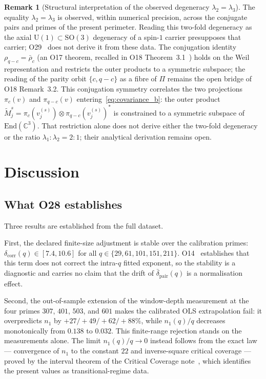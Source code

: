 \documentclass[11pt,a4paper]{article}
\theoremstyle{definition}
\newtheorem{remark}[theorem]{Remark}
\begin{document}
    \begin{remark}[Structural interpretation of the observed degeneracy $\lambda_2 = \lambda_3$]
      \label{rem:degeneracy}
      The equality $\lambda_2 = \lambda_3$ is observed, within numerical precision, across the
      conjugate pairs and primes of the present perimeter.
      Reading this two-fold degeneracy as the axial $\mathrm{U}(1) \subset \mathrm{SO}(3)$
      degeneracy of a spin-$1$ carrier presupposes that carrier; O29~\cite{Beau2026a33} does not
      derive it from these data.
      The conjugation identity $\rho_{q-c} = \bar\rho_c$ (an O17 theorem, recalled in O18
      Theorem~3.1~\cite{Beau2026a22}) holds on the Weil representation and
      restricts the outer products to a symmetric subspace; the reading of the parity orbit
      $\{c, q-c\}$ as a fibre of $\Pi$ remains the open bridge of O18 Remark~3.2.
      This conjugation symmetry correlates the two projections $\pi_c(v)$ and
      $\pi_{q-c}(v)$ entering~\eqref{eq:covariance_b}: the outer product
      $\widetilde{M}^s_j = \pi_c(v^{(s)}_j) \otimes \pi_{q-c}(v^{(s)}_j)^*$
      is constrained to a symmetric subspace of $\mathrm{End}(\mathbb{C}^3)$.
      That restriction alone does not derive either the two-fold degeneracy or the ratio
      $\lambda_1 : \lambda_2 = 2 : 1$; their analytical derivation remains open.
    \end{remark}

  \section{Discussion}

  \subsection{What O28 establishes}

    Three results are established from the full dataset.

    First, the declared finite-size adjustment is stable over the calibration primes:
    $\delta_{\mathrm{corr}}(q) \in [7.4, 10.6]$ for all $q \in \{29, 61, 101, 151, 211\}$.
    O14~\cite{Beau2026a18} establishes that this term does not correct the intra-$q$ fitted
    exponent, so the stability is a diagnostic and carries no claim that the drift of
    $\bar{\delta}_{\mathrm{pair}}(q)$ is a normalisation effect.

    Second, the out-of-sample extension of the window-depth measurement at the four primes
    $307$, $401$, $503$, and $601$ makes the calibrated OLS extrapolation fail: it overpredicts
    $n_1$ by $+27/+49/+62/+88\%$, while $n_1(q)/q$ decreases monotonically from $0.138$ to $0.032$.
    This finite-range rejection stands on the measurements alone.
    The limit $n_1(q)/q \to 0$ instead follows from the exact law --- convergence of $n_1$ to the
    constant $22$ and inverse-square critical coverage --- proved by the interval theorem of the
    Critical Coverage note~\cite{Beau2026ccnote}, which identifies the present values as
    transitional-regime data.
\end{document}
